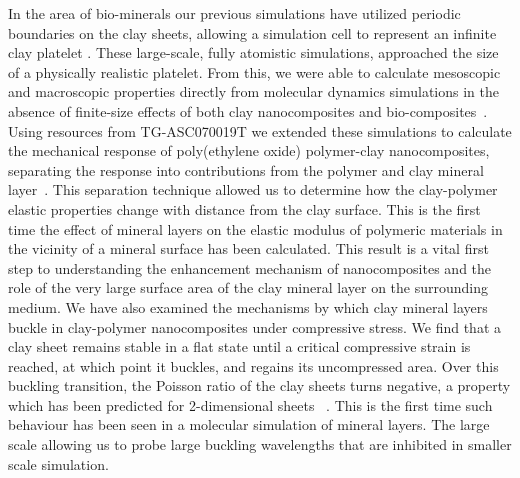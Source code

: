 In the area of bio-minerals our previous simulations have utilized periodic boundaries on the clay sheets, allowing a simulation cell to represent an infinite clay platelet \cite{JPCC_2007,Thyveetil,Thyveetil_JACS, Soft_Matter1}. These large-scale, fully atomistic simulations, approached the size of a physically realistic platelet. From this, we were able to calculate mesoscopic and macroscopic properties directly from molecular dynamics simulations in the absence of finite-size effects of both clay nanocomposites\cite{JPCC_2007,Thyveetil, Soft_Matter1} and bio-composites~\cite{Thyveetil_JACS}.  Using resources from TG-ASC070019T we extended these simulations to calculate the mechanical response of poly(ethylene oxide) polymer-clay nanocomposites, separating the response into contributions from the polymer and clay mineral layer~\cite{Soft_Matter1}. This separation technique allowed us to determine how the clay-polymer elastic properties change with distance from the clay surface. This is the first time the effect of mineral layers on the elastic modulus of polymeric materials in the vicinity of a mineral surface has been calculated. This result is a vital first step to understanding the enhancement mechanism of nanocomposites and the role of the very large surface area of the clay mineral layer on the surrounding medium.  We have also examined the mechanisms by which clay mineral layers buckle in clay-polymer nanocomposites under compressive stress. We find that a clay sheet remains stable in a flat state until a critical compressive strain is reached, at which point it buckles, and regains its uncompressed area. Over this buckling transition, the Poisson ratio of the clay sheets turns negative, a property which has been predicted for 2-dimensional sheets ~\cite{Soft_Matter2}. This is the first time such behaviour has been seen in a molecular simulation of mineral layers. The large scale allowing us to probe large buckling wavelengths that are inhibited in smaller scale simulation.
